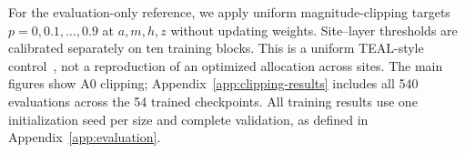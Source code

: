 For the evaluation-only reference, we apply uniform magnitude-clipping targets
$p=0,0.1,\ldots,0.9$ at $a,m,h,z$ without updating weights. Site--layer
thresholds are calibrated separately on ten training blocks. This is a
uniform TEAL-style control~\citep{liu2024teal}, not a reproduction of an
optimized allocation across sites. The main figures show A0 clipping;
Appendix~\ref{app:clipping-results} includes all 540 evaluations across the
54 trained checkpoints. All training results use one initialization seed
per size and complete validation, as defined in Appendix~\ref{app:evaluation}.





